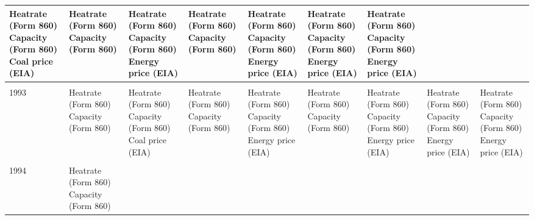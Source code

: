 \documentclass[10pt]{report}
\begin{document}
\begin{scriptsize}
\begin{landscape}
\begin{center}
\begin{longtable}{|lllllllll|}
\shortstack{Heatrate (Form 860) \\ Capacity (Form 860) \\ Coal price (EIA)} &
\shortstack{Heatrate (Form 860) \\ Capacity (Form 860)} &
\shortstack{Heatrate (Form 860) \\ Capacity (Form 860) \\ Energy price (EIA)} &
\shortstack{Heatrate (Form 860) \\ Capacity (Form 860)} &
\shortstack{Heatrate (Form 860) \\ Capacity (Form 860) \\ Energy price (EIA)} &
\shortstack{Heatrate (Form 860) \\ Capacity (Form 860) \\ Energy price (EIA)} &
\shortstack{Heatrate (Form 860) \\ Capacity (Form 860) \\ Energy price (EIA)}\\
\hline \\
1993 & \shortstack{Heatrate (Form 860) \\ Capacity (Form 860)}  &
\shortstack{Heatrate (Form 860) \\ Capacity (Form 860) \\ Coal price (EIA)} &
\shortstack{Heatrate (Form 860) \\ Capacity (Form 860)} &
\shortstack{Heatrate (Form 860) \\ Capacity (Form 860) \\ Energy price (EIA)} &
\shortstack{Heatrate (Form 860) \\ Capacity (Form 860)} &
\shortstack{Heatrate (Form 860) \\ Capacity (Form 860) \\ Energy price (EIA)} &
\shortstack{Heatrate (Form 860) \\ Capacity (Form 860) \\ Energy price (EIA)} &
\shortstack{Heatrate (Form 860) \\ Capacity (Form 860) \\ Energy price (EIA)} \\
\hline \\
1994 & \shortstack{Heatrate (Form 860) \\ Capacity (Form 860)}  &

\end{longtable}
\end{center}
\end{landscape}
\end{scriptsize}
\end{document}
